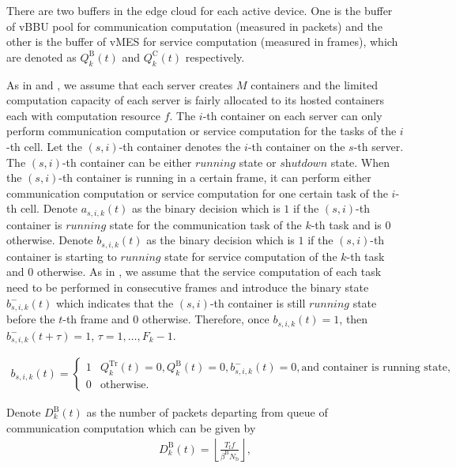 \documentclass[journal, 12pt, onecolumn, draftclsnofoot]{IEEEtran}
\newcommand{\needref}[1]{\text{[#1]}}
\begin{document}
There are two buffers in the edge cloud for each active device. One is the buffer of vBBU pool for communication computation (measured in packets) and the other is the buffer of vMES for service computation (measured in frames), which are denoted as $Q_{k}^{\mathrm{B}}(t)$ and $Q_{k}^{\mathrm{C}}(t)$ respectively.

As in \needref{6582405} and \needref{8353131}, we assume that each server creates $M$ containers and the limited computation capacity of each server is fairly allocated to its hosted containers each with computation resource $f$. The $i$-th container on each server can only perform communication computation or service computation for the tasks of the $i$-th cell. Let the $(s,i)$-th container denotes the $i$-th container on the $s$-th server. The $(s,i)$-th container can be either $\textit{running}$ state or $\textit{shutdown}$ state. When the $(s,i)$-th container is running in a certain frame, it can perform either communication computation or service computation for one certain task of the $i$-th cell. Denote $a_{s,i,k}(t)$ as the binary decision which is $1$ if the $(s,i)$-th container is $\textit{running}$ state for the communication task of the $k$-th task and is $0$ otherwise. Denote $b_{s,i,k}(t)$ as the binary decision which is $1$ if the $(s,i)$-th container is starting to $\textit{running}$ state for service computation of the $k$-th task and $0$ otherwise. As in \cite{}, we assume that the service computation of each task need to be performed in consecutive frames and introduce the binary state $b_{s,i,k}^{-}(t)$ which indicates that the $(s,i)$-th container is still $\textit{running}$ state before the $t$-th frame and $0$ otherwise. Therefore, once $b_{s,i,k}(t)=1$, then $b_{s,i,k}^{-}(t+\tau)=1$, $\tau=1,\ldots,F_{k}-1$.

\begin{align}
	b_{s,i,k}(t)=
	\begin{cases}
		1 &Q_{k}^{\mathrm{Tr}}(t)=0,Q_{k}^{\mathrm{B}}(t)=0,b_{s,i,k}^{-}(t)=0,\text{and container is running state,}\\
		0 &\text{otherwise}.
	\end{cases}
\end{align}

Denote $D_{k}^{\mathrm{B}}(t)$ as the number of packets departing from queue of communication computation which can be given by
\begin{align}
	D_{k}^{\mathrm{B}}(t)=\left\lfloor\frac{T_{\mathrm{f}}f}{\beta^{\mathrm{B}}N_{\mathrm{b}}}\right\rfloor,
\end{align}
\end{document}
